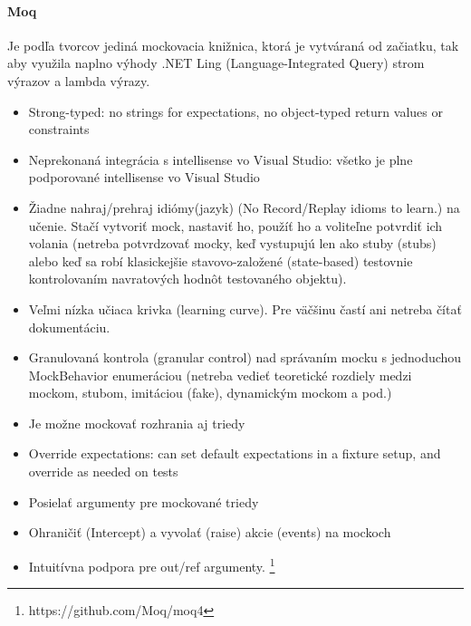 \documentclass[11pt,twoside,slovak,a4paper]{article}
\begin{document}
			\paragraph{Moq} Je podľa tvorcov jediná mockovacia knižnica, ktorá je vytváraná od začiatku, tak aby využila naplno výhody .NET Ling (Language-Integrated Query) strom výrazov a lambda výrazy.
			\begin{itemize}
				\item Strong-typed: no strings for expectations, no object-typed return values or constraints
				\item Neprekonaná integrácia s intellisense vo Visual Studio: všetko je plne podporované intellisense vo Visual Studio
				\item Žiadne nahraj/prehraj idiómy(jazyk) (No Record/Replay idioms to learn.) na učenie. Stačí vytvoriť mock, nastaviť ho, použíť ho a voliteľne potvrdiť ich volania (netreba potvrdzovať mocky, keď vystupujú len ako stuby (stubs) alebo keď sa robí klasickejšie stavovo-založené (state-based) testovnie kontrolovaním navratových hodnôt testovaného objektu).
				\item Veľmi nízka učiaca krivka (learning curve). Pre väčšinu častí ani netreba čítať dokumentáciu.
				\item Granulovaná kontrola (granular control) nad správaním mocku s jednoduchou MockBehavior enumeráciou (netreba vedieť teoretické rozdiely medzi mockom, stubom, imitáciou (fake), dynamickým mockom a pod.)
				\item Je možne mockovať rozhrania aj triedy
				\item Override expectations: can set default expectations in a fixture setup, and override as needed on tests
				\item Posielať argumenty pre mockované triedy
				\item Ohraničiť (Intercept) a vyvolať (raise) akcie (events) na mockoch
				\item Intuitívna podpora pre out/ref argumenty. \footnote{https://github.com/Moq/moq4}	
			\end{itemize}
			
\end{document}
